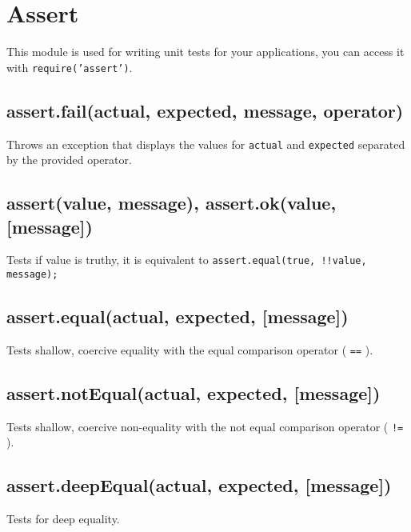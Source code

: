 \section{Assert}

\begin{Shaded}
\begin{Highlighting}[]
\NormalTok{: } 
\end{Highlighting}
\end{Shaded}

This module is used for writing unit tests for your applications, you
can access it with \texttt{require('assert')}.

\subsection{assert.fail(actual, expected, message, operator)}

Throws an exception that displays the values for \texttt{actual} and
\texttt{expected} separated by the provided operator.

\subsection{assert(value, message), assert.ok(value, {[}message{]})}

Tests if value is truthy, it is equivalent to
\texttt{assert.equal(true, !!value, message);}

\subsection{assert.equal(actual, expected, {[}message{]})}

Tests shallow, coercive equality with the equal comparison operator (
\texttt{==} ).

\subsection{assert.notEqual(actual, expected, {[}message{]})}

Tests shallow, coercive non-equality with the not equal comparison
operator ( \texttt{!=} ).

\subsection{assert.deepEqual(actual, expected, {[}message{]})}

Tests for deep equality.

